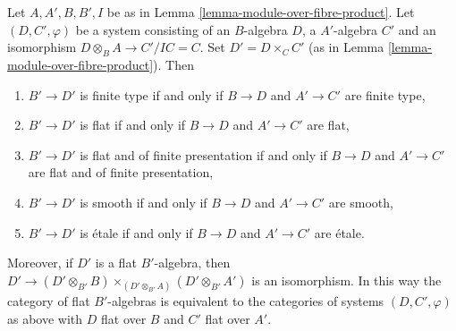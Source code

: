 \begin{lemma}
\label{lemma-properties-algebras-over-fibre-product}
Let $A, A', B, B', I$ be as in
Lemma \ref{lemma-module-over-fibre-product}.
Let $(D, C', \varphi)$ be a system consisting of an $B$-algebra $D$,
a $A'$-algebra $C'$ and an isomorphism $D \otimes_B A \to C'/IC = C$.
Set $D' = D \times_C C'$ (as in
Lemma \ref{lemma-module-over-fibre-product}). Then
\begin{enumerate}
\item $B' \to D'$ is finite type if and only if $B \to D$ and
$A' \to C'$ are finite type,
\item $B' \to D'$ is flat if and only if $B \to D$ and $A' \to C'$ are flat,
\item $B' \to D'$ is flat and of finite presentation if and only if
$B \to D$ and $A' \to C'$ are flat and of finite presentation,
\item $B' \to D'$ is smooth if and only if $B \to D$ and $A' \to C'$ are smooth,
\item $B' \to D'$ is \'etale if and only if $B \to D$ and $A' \to C'$
are \'etale.
\end{enumerate}
Moreover, if $D'$ is a flat $B'$-algebra, then
$D' \to (D' \otimes_{B'} B) \times_{(D' \otimes_{B'} A)} (D' \otimes_{B'} A')$
is an isomorphism. In this way the category of flat $B'$-algebras
is equivalent to the categories of systems $(D, C', \varphi)$ as above
with $D$ flat over $B$ and $C'$ flat over $A'$.
\end{lemma}

